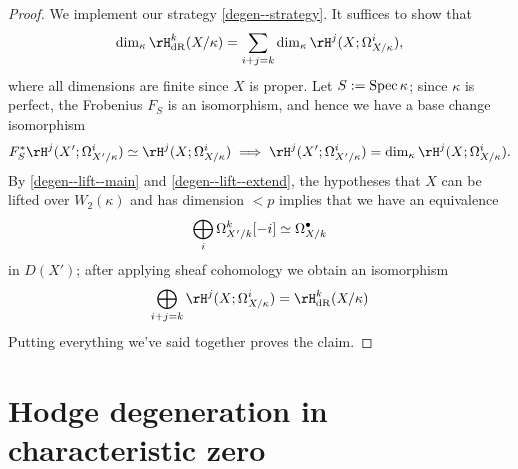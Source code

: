 \begin{proof}
  We implement our strategy \cref{degen--strategy}. It suffices to show that
  \[
    \dim_\kappa \rH_\dR^k(X/\kappa) = \sum_{i+j=k} \dim_\kappa \rH^j(X;\Omega_{X/\kappa}^i),
  \]
  where all dimensions are finite since $X$ is proper. Let $S \mathrel{:=} \operatorname{Spec} \kappa$; since $\kappa$ is perfect, the Frobenius $F_S$ is an isomorphism, and hence we have a base change isomorphism
  \[
    F_S^*\rH^j(X';\Omega_{X'/\kappa}^i) \iso \rH^j(X;\Omega_{X/\kappa}^i) \implies \rH^j(X';\Omega_{X'/\kappa}^i) = \dim_\kappa \rH^j(X;\Omega_{X/\kappa}^i).
  \]
  By \cref{degen--lift--main} and \cref{degen--lift--extend}, the hypotheses that $X$ can be lifted over $W_2(\kappa)$ and has dimension $< p$ implies that we have an equivalence
  \[
    \bigoplus_i \Omega_{X'/k}^k[-i] \simeq \Omega_{X/k}^\bullet
  \]
  in $D(X')$; after applying sheaf cohomology we obtain an isomorphism
  \[
    \bigoplus_{i+j=k} \rH^j(X;\Omega_{X/\kappa}^i) = \rH_\dR^k(X/\kappa)
  \]
  Putting everything we've said together proves the claim.
\end{proof}


\section{Hodge degeneration in characteristic zero}
\label{degenz}


% 
% 


